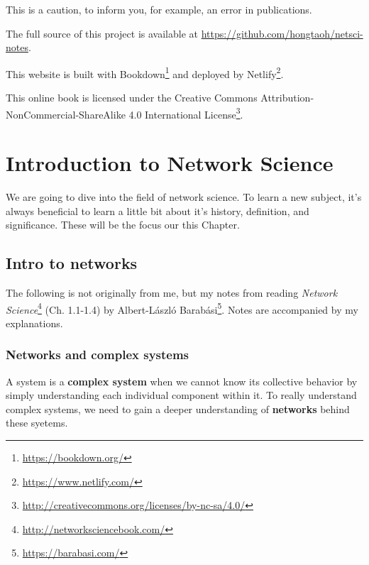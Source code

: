 \documentclass[
]{krantz}
\makeatletter
\renewcommand{\href}[2]{#2\footnote{\url{#1}}}
\newenvironment{kframe}{%
\medskip{}
\setlength{\fboxsep}{.8em}
 \def\at@end@of@kframe{}%
 \ifinner\ifhmode%
  \def\at@end@of@kframe{\end{minipage}}%
  \begin{minipage}{\columnwidth}%
 \fi\fi%
 \def\FrameCommand##1{\hskip\@totalleftmargin \hskip-\fboxsep
 \colorbox{shadecolor}{##1}\hskip-\fboxsep
     \hskip-\linewidth \hskip-\@totalleftmargin \hskip\columnwidth}%
 \MakeFramed {\advance\hsize-\width
   \@totalleftmargin\z@ \linewidth\hsize
   \@setminipage}}%
 {\par\unskip\endMakeFramed%
 \at@end@of@kframe}
\newenvironment{rmdblock}[1]
  {
  \begin{itemize}
  \renewcommand{\labelitemi}{
    \raisebox{-.7\height}[0pt][0pt]{
      {\setkeys{Gin}{width=3em,keepaspectratio}\texttt{[image: images/\#1]}}
    }
  }
  \setlength{\fboxsep}{1em}
  \begin{kframe}
  \item
  }
  {
  \end{kframe}
  \end{itemize}
  }
\newenvironment{rmdnote}
  {\begin{rmdblock}{note}}
  {\end{rmdblock}}
\newenvironment{rmdcaution}
  {\begin{rmdblock}{caution}}
  {\end{rmdblock}}
\makeatother
\begin{document}
\begin{rmdcaution}
This is a caution, to inform you, for example, an error in publications.
\end{rmdcaution}

The full source of this project is available at \url{https://github.com/hongtaoh/netsci-notes}.

This website is built with \href{https://bookdown.org/}{Bookdown} and deployed by \href{https://www.netlify.com/}{Netlify}.

This online book is licensed under the \href{http://creativecommons.org/licenses/by-nc-sa/4.0/}{Creative Commons Attribution-NonCommercial-ShareAlike 4.0 International License}.

\mainmatter

\hypertarget{intro}{%
\chapter{Introduction to Network Science}\label{intro}}

We are going to dive into the field of network science. To learn a new subject, it's always beneficial to learn a little bit about it's history, definition, and significance. These will be the focus our this Chapter.

\hypertarget{intro-to-networks}{%
\section{Intro to networks}\label{intro-to-networks}}

\begin{rmdnote}
The following is not originally from me, but my notes from reading \href{http://networksciencebook.com/}{\emph{Network Science}} (Ch. 1.1-1.4) by \href{https://barabasi.com/}{Albert-László Barabási}. Notes are accompanied by my explanations.
\end{rmdnote}

\hypertarget{networks-and-complex-systems}{%
\subsection{Networks and complex systems}\label{networks-and-complex-systems}}

A system is a \textbf{complex system} when we cannot know its collective behavior by simply understanding each individual component within it. To really understand complex systems, we need to gain a deeper understanding of \textbf{networks} behind these syetems.
\end{document}
